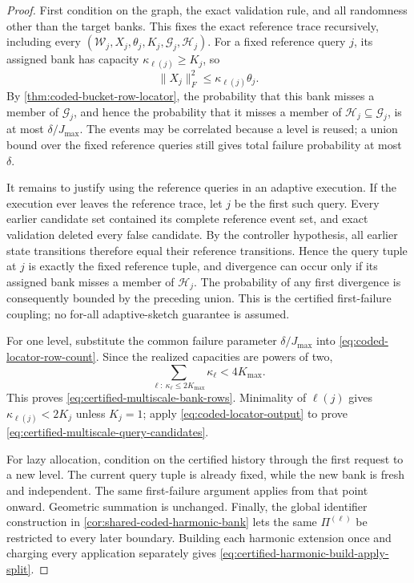 \begin{proof}
First condition on the graph, the exact validation rule, and all randomness
other than the target banks.  This fixes the exact reference trace
recursively, including every
$(\mathcal W_j,X_j,\theta_j,K_j,\mathcal G_j,\mathcal H_j)$.  For a fixed reference query
$j$, its assigned bank has capacity
$\kappa_{\ell(j)}\geq K_j$, so
\begin{equation*}
 \|X_j\|_F^2\leq\kappa_{\ell(j)}\theta_j.
\end{equation*}
By \cref{thm:coded-bucket-row-locator}, the probability that this bank misses
a member of $\mathcal G_j$, and hence the probability that it misses a member
of $\mathcal H_j\subseteq\mathcal G_j$, is at most
$\delta/J_{\max}$.  The events may be
correlated because a level is reused; a union bound over the fixed reference
queries still gives total failure probability at most $\delta$.

It remains to justify using the reference queries in an adaptive execution.
If the execution ever leaves the reference trace, let $j$ be the first such
query.  Every earlier candidate set contained its complete reference event
set, and exact validation deleted every false candidate.  By the controller
hypothesis, all earlier state transitions therefore equal their reference
transitions.  Hence the query tuple at $j$ is exactly the fixed reference
tuple, and divergence can occur only if its assigned bank misses a member of
$\mathcal H_j$.  The probability of any first divergence is consequently
bounded by the preceding union.  This is the certified first-failure
coupling; no for-all adaptive-sketch guarantee is assumed.

For one level, substitute the common failure parameter
$\delta/J_{\max}$ into
\cref{eq:coded-locator-row-count}.  Since the realized capacities are powers
of two,
\begin{equation*}
 \sum_{\ell:\ \kappa_\ell\leq2K_{\max}}\kappa_\ell
 <4K_{\max}.
\end{equation*}
This proves \cref{eq:certified-multiscale-bank-rows}.  Minimality of
$\ell(j)$ gives $\kappa_{\ell(j)}<2K_j$ unless $K_j=1$; apply
\cref{eq:coded-locator-output} to prove
\cref{eq:certified-multiscale-query-candidates}.

For lazy allocation, condition on the certified history through the first
request to a new level.  The current query tuple is already fixed, while the
new bank is fresh and independent.  The same first-failure argument applies
from that point onward.  Geometric summation is unchanged.  Finally, the
global identifier construction in
\cref{cor:shared-coded-harmonic-bank} lets the same $\Pi^{(\ell)}$ be
restricted to every later boundary.  Building each harmonic extension once
and charging every application separately gives
\cref{eq:certified-harmonic-build-apply-split}.
\end{proof}

